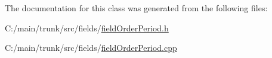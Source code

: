 The documentation for this class was generated from the following files:\begin{DoxyCompactItemize}
\item 
C:/main/trunk/src/fields/\hyperlink{field_order_period_8h}{fieldOrderPeriod.h}\item 
C:/main/trunk/src/fields/\hyperlink{field_order_period_8cpp}{fieldOrderPeriod.cpp}\end{DoxyCompactItemize}
